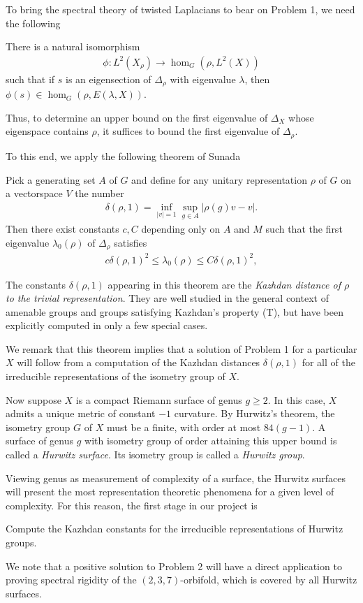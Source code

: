 \documentclass[11pt]{article}
\begin{document}
To bring the spectral theory of twisted Laplacians to bear on Problem 1, we need the following \cite{Heintze1978}
\begin{lemma}
  There is a natural isomorphism 
  \begin{align*}
    \phi: L^2(X_\rho) \to \hom_G(\rho,L^2(X))
  \end{align*}
  such that if $s$ is an eigensection of $\Delta_\rho$ with eigenvalue $\lambda$, then $\phi(s) \in \hom_G(\rho,E(\lambda, X))$.
\end{lemma} 
Thus, to determine an upper bound on the first eigenvalue of $\Delta_X$ whose eigenspace contains $\rho$, it suffices to bound the first eigenvalue of $\Delta_\rho$.

To this end, we apply the following theorem of Sunada \cite{sunada1989}
\begin{thm}
  Pick a generating set $A$ of $G$ and define for any unitary representation $\rho$ of $G$ on a vectorspace $V$ the number
  \begin{align*}
    \delta(\rho,1)=\inf_{|v|=1} \sup _{g\in A} |\rho(g)v-v|.
  \end{align*} Then there exist constants $c,C$ depending only on $A$ and $M$ such that the first eigenvalue $\lambda_0(\rho)$ of $\Delta_\rho$ satisfies
    \begin{align*}
      c \delta(\rho,1)^2\leq \lambda_0(\rho)\leq C\delta(\rho,1)^2, 
    \end{align*} 
\end{thm}
The constants $\delta(\rho,1)$ appearing in this theorem are the \emph{Kazhdan distance 
  of $\rho$ to the trivial representation}. They are well studied in the general context of amenable groups and groups satisfying Kazhdan's property (T), but have been explicitly computed in only a few special cases. 

We remark that this theorem implies that a solution of Problem 1 for a particular $X$ will follow from a computation of the Kazhdan distances $\delta(\rho,1)$ for all of the irreducible representations of the isometry group of $X$.


 Now suppose $X$ is a compact Riemann surface of genus $g\geq 2$. In this case, $X$ admits a unique metric of constant $-1$ curvature. By Hurwitz's theorem, the isometry group $G$ of $X$ must be a finite, with order at most $84(g-1)$. A surface  of genus $g$ with isometry group of order attaining this upper bound is called a \emph{Hurwitz surface}. Its isometry group is called a \emph{Hurwitz group}.
 
 Viewing genus as measurement of complexity of a surface, the Hurwitz surfaces will present the most representation theoretic phenomena for a given level of complexity. For this reason, the first stage in our project is
\begin{problem}
  Compute the Kazhdan constants for the irreducible representations of Hurwitz groups.
\end{problem}
We note that a positive solution to Problem 2 will have a direct application to proving spectral rigidity of the $(2,3,7)$-orbifold, which  is covered by all Hurwitz surfaces.  


{}

\end{document}
